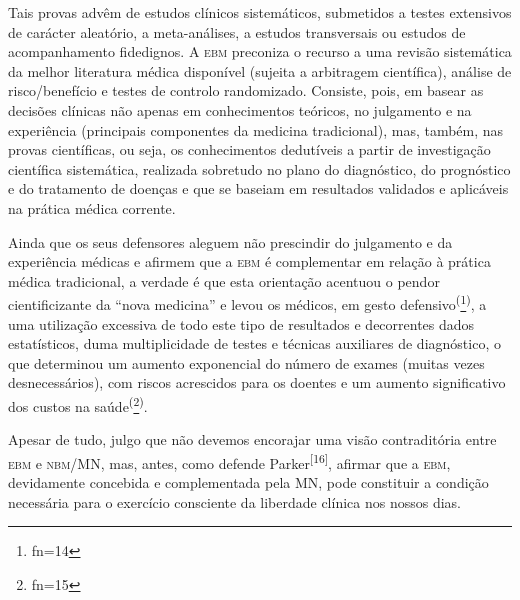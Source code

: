 \documentclass{article}
\makeatletter
\newcommand{\fn}{\afterassignment\fn@aux\count0=}
\newcommand{\fn@aux}{\csname fn\the\count0\endcsname}
\makeatother
\begin{document}
Tais provas advêm de estudos clínicos sistemáticos, submetidos a testes
extensivos de carácter aleatório, a meta-análises, a estudos transversais ou
estudos de acompanhamento fidedignos. A \textsc{ebm} preconiza o recurso a uma revisão
sistemática da melhor literatura médica disponível (sujeita a arbitragem
científica), análise de risco/benefício e testes de controlo randomizado.
Consiste, pois, em basear as decisões clínicas não apenas em conhecimentos
teóricos, no julgamento e na experiência (principais componentes da medicina
tradicional), mas, também, nas provas científicas, ou seja, os conhecimentos
dedutíveis a partir de investigação científica sistemática, realizada sobretudo
no plano do diagnóstico, do prognóstico e do tratamento de doenças e que se
baseiam em resultados validados e aplicáveis na prática médica corrente.

Ainda que os seus defensores aleguem não prescindir do julgamento e da
experiência médicas e afirmem que a \textsc{ebm} é complementar em relação à prática
médica tradicional, a verdade é que esta orientação acentuou o pendor
cientificizante da “nova medicina” e levou os médicos, em gesto
defensivo\textsuperscript{(}\footnote{\fn14}\textsuperscript{)}, a uma utilização excessiva de todo este tipo de resultados e decorrentes dados
estatísticos, duma multiplicidade de testes e técnicas auxiliares de
diagnóstico, o que determinou um aumento exponencial do número de exames (muitas
vezes desnecessários), com riscos acrescidos para os doentes e um aumento
significativo dos custos na saúde\textsuperscript{(}\footnote{\fn15}\textsuperscript{)}.

Apesar de tudo, julgo que não devemos encorajar uma visão contraditória entre
\textsc{ebm} e \textsc{nbm}/MN, mas, antes, como defende
Parker\textsuperscript{[}\textsuperscript{16}\textsuperscript{]}, afirmar que a \textsc{ebm}, devidamente concebida e complementada pela MN, pode
constituir a condição necessária para o exercício consciente da liberdade
clínica nos nossos dias.
\end{document}
